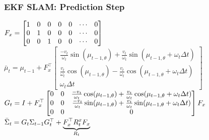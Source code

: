 \begin{frame}
    \frametitle{EKF SLAM: Prediction Step}

    \begin{algorithmic}[1]
        \State $F_{x} = \begin{bmatrix}
        1 & 0 & 0 & 0 & 0 & \cdots & 0 \\
        0 & 1 & 0 & 0 & 0 & \cdots & 0 \\
        0 & 0 & 1 & 0 & 0 & \cdots & 0 \\
        \end{bmatrix}$
        \vspace{1em}
        \State $\bar{\mu}_t = \mu_{t-1} + F_x^{\top}
        \begin{bmatrix}
        \frac{-v_t}{\omega_t} \sin(\mu_{t-1,\theta}) + \frac{v_t}{\omega_t} \sin(\mu_{t-1,\theta} + \omega_t \Delta t) \\
        \frac{v_t}{\omega_t} \cos(\mu_{t-1,\theta}) - \frac{v_t}{\omega_t} \cos(\mu_{t-1,\theta} + \omega_t \Delta t) \\
        \omega_t \Delta t
        \end{bmatrix}$
        \vspace{1em}
        \State $G_t = I + F_{x}^{\top}
        \begin{bmatrix}
        0 & 0 & \frac{-v_t}{\omega_t} \cos(\mu_{t-1,\theta}) + \frac{v_t}{\omega_t} \cos(\mu_{t-1,\theta} + \omega_t \Delta t) \\
        0 & 0 & \frac{-v_t}{\omega_t} \sin(\mu_{t-1,\theta}) + \frac{v_t}{\omega_t} \sin(\mu_{t-1,\theta} + \omega_t \Delta t) \\
        0 & 0 & 0
        \end{bmatrix} F_{x}$
        \vspace{1em}
        \State $\bar{\Sigma}_t = G_{t} \Sigma_{t-1} G_{t}^{\top} + \underbrace{F_{x}^{\top} R_{t}^{x} F_{x}}_{R_t}$
        \EndProcedure
    \end{algorithmic}
    
\end{frame}

